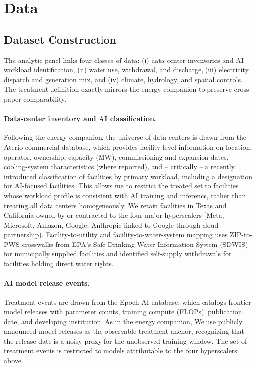 \documentclass[11pt, letterpaper]{article}
\begin{document}
\section{Data}
\label{sec:data}

\subsection{Dataset Construction}
\label{sec:datasetconstruction}

The analytic panel links four classes of data: (i) data-center inventories and AI workload identification, (ii) water use, withdrawal, and discharge, (iii) electricity dispatch and generation mix, and (iv) climate, hydrology, and spatial controls. The treatment definition exactly mirrors the energy companion to preserve cross-paper comparability.

\paragraph{Data-center inventory and AI classification.} Following the energy companion, the universe of data centers is drawn from the Aterio commercial database, which provides facility-level information on location, operator, ownership, capacity (MW), commissioning and expansion dates, cooling-system characteristics (where reported), and -- critically -- a recently introduced classification of facilities by primary workload, including a designation for AI-focused facilities. This allows me to restrict the treated set to facilities whose workload profile is consistent with AI training and inference, rather than treating all data centers homogeneously. We retain facilities in Texas and California owned by or contracted to the four major hyperscalers (Meta, Microsoft, Amazon, Google; Anthropic linked to Google through cloud partnership). Facility-to-utility and facility-to-water-system mapping uses ZIP-to-PWS crosswalks from EPA's Safe Drinking Water Information System (SDWIS) for municipally supplied facilities and identified self-supply withdrawals for facilities holding direct water rights.

\paragraph{AI model release events.} Treatment events are drawn from the Epoch AI database, which catalogs frontier model releases with parameter counts, training compute (FLOPs), publication date, and developing institution. As in the energy companion, We use publicly announced model releases as the observable treatment anchor, recognizing that the release date is a noisy proxy for the unobserved training window. The set of treatment events is restricted to models attributable to the four hyperscalers above.
\end{document}
